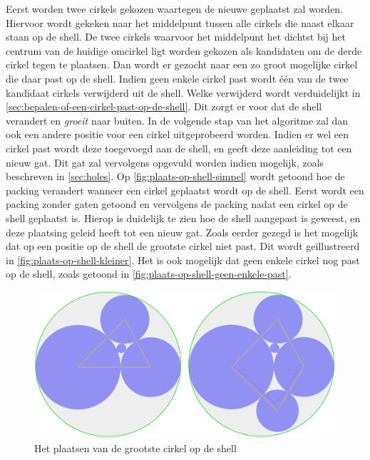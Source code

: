 \documentclass[12pt,a4paper,oneside]{book}
\begin{document}
Eerst worden twee cirkels gekozen waartegen de nieuwe geplaatst zal worden.
Hiervoor wordt gekeken naar het middelpunt tussen alle cirkels die naast elkaar staan op de shell.
De twee cirkels waarvoor het middelpunt het dichtst bij het centrum van de huidige omcirkel ligt worden gekozen als kandidaten om de derde cirkel tegen te plaatsen.
Dan wordt er gezocht naar een zo groot mogelijke cirkel die daar past op de shell.
Indien geen enkele cirkel past wordt één van de twee kandidaat cirkels verwijderd uit de shell.
Welke verwijderd wordt verduidelijkt in \autoref{sec:bepalen-of-een-cirkel-past-op-de-shell}.
Dit zorgt er voor dat de shell verandert en \textit{groeit} naar buiten.
In de volgende stap van het algoritme zal dan ook een andere positie voor een cirkel uitgeprobeerd worden.
Indien er wel een cirkel past wordt deze toegevoegd aan de shell, en geeft deze aanleiding tot een nieuw gat.
Dit gat zal vervolgens opgevuld worden indien mogelijk, zoals beschreven in \autoref{sec:holes}.
Op \autoref{fig:plaats-op-shell-simpel} wordt getoond hoe de packing verandert wanneer een cirkel geplaatst wordt op de shell.
Eerst wordt een packing zonder gaten getoond en vervolgens de packing nadat een cirkel op de shell geplaatst is.
Hierop is duidelijk te zien hoe de shell aangepast is geweest, en deze plaatsing geleid heeft tot een nieuw gat.
Zoals eerder gezegd is het mogelijk dat op een positie op de shell de grootste cirkel niet past.
Dit wordt geïllustreerd in \autoref{fig:plaats-op-shell-kleiner}.
Het is ook mogelijk dat geen enkele cirkel nog past op de shell, zoals getoond in \autoref{fig:plaats-op-shell-geen-enkele-past}.

\begin{figure}
  \centering
  \includegraphics[width=1.0\textwidth]{plaats-op-shell-simpel.png}
  \caption{Het plaatsen van de grootste cirkel op de shell} \label{fig:plaats-op-shell-simpel} 
\end{figure}
\end{document}

